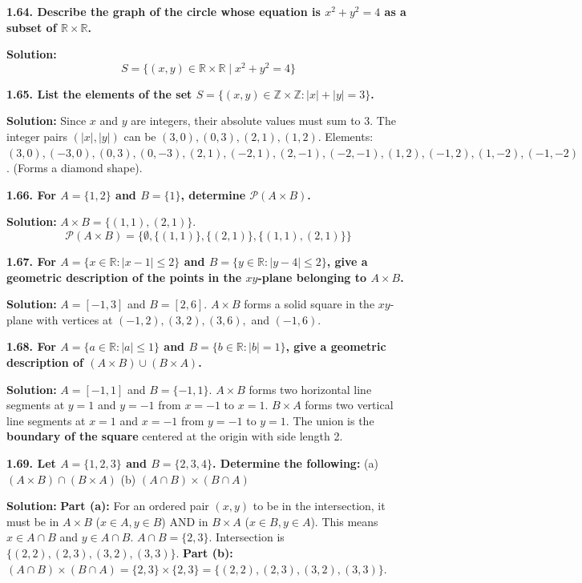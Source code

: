 \documentclass[12pt]{article}
\begin{document}
\textbf{1.64. Describe the graph of the circle whose equation is $x^2 + y^2 = 4$ as a subset of $\mathbb{R} \times \mathbb{R}$.}

\textbf{Solution:}
\[ S = \{(x, y) \in \mathbb{R} \times \mathbb{R} \mid x^2 + y^2 = 4\} \]

\hrulefill

\textbf{1.65. List the elements of the set $S = \{(x,y) \in \mathbb{Z} \times \mathbb{Z} : |x| + |y| = 3\}$.}

\textbf{Solution:}
Since $x$ and $y$ are integers, their absolute values must sum to 3. The integer pairs $(|x|, |y|)$ can be $(3, 0), (0, 3), (2, 1), (1, 2)$.
Elements: $(3,0), (-3,0), (0,3), (0,-3), (2,1), (-2,1), (2,-1), (-2,-1), (1,2), (-1,2), (1,-2), (-1,-2)$. (Forms a diamond shape).

\hrulefill

\textbf{1.66. For $A = \{1, 2\}$ and $B = \{1\}$, determine $\mathcal{P}(A \times B)$.}

\textbf{Solution:}
$A \times B = \{(1,1), (2,1)\}$.
\[ \mathcal{P}(A \times B) = \{\emptyset, \{(1,1)\}, \{(2,1)\}, \{(1,1), (2,1)\}\} \]

\hrulefill

\textbf{1.67. For $A = \{x \in \mathbb{R} : |x-1| \le 2\}$ and $B = \{y \in \mathbb{R} : |y-4| \le 2\}$, give a geometric description of the points in the $xy$-plane belonging to $A \times B$.}

\textbf{Solution:}
$A = [-1, 3]$ and $B = [2, 6]$.
$A \times B$ forms a solid square in the $xy$-plane with vertices at $(-1, 2), (3, 2), (3, 6),$ and $(-1, 6)$.

\hrulefill

\textbf{1.68. For $A = \{a \in \mathbb{R} : |a| \le 1\}$ and $B = \{b \in \mathbb{R} : |b| = 1\}$, give a geometric description of $(A \times B) \cup (B \times A)$.}

\textbf{Solution:}
$A = [-1, 1]$ and $B = \{-1, 1\}$.
$A \times B$ forms two horizontal line segments at $y=1$ and $y=-1$ from $x=-1$ to $x=1$.
$B \times A$ forms two vertical line segments at $x=1$ and $x=-1$ from $y=-1$ to $y=1$.
The union is the \textbf{boundary of the square} centered at the origin with side length 2.

\hrulefill

\textbf{1.69. Let $A = \{1, 2, 3\}$ and $B = \{2, 3, 4\}$. Determine the following:}
(a) $(A \times B) \cap (B \times A)$ \quad (b) $(A \cap B) \times (B \cap A)$

\textbf{Solution:}
\textbf{Part (a):} For an ordered pair $(x,y)$ to be in the intersection, it must be in $A \times B$ ($x \in A, y \in B$) AND in $B \times A$ ($x \in B, y \in A$). This means $x \in A \cap B$ and $y \in A \cap B$.
$A \cap B = \{2, 3\}$.
Intersection is $\{(2,2), (2,3), (3,2), (3,3)\}$.
\textbf{Part (b):} $(A \cap B) \times (B \cap A) = \{2, 3\} \times \{2, 3\} = \{(2,2), (2,3), (3,2), (3,3)\}$.
\end{document}
